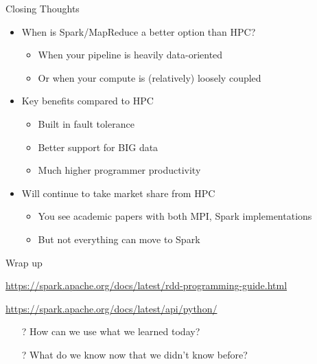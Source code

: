 \documentclass[aspectratio=169]{beamer}
\begin{document}
\begin{frame}{Closing Thoughts}

\begin{itemize}
\item When is Spark/MapReduce a better option than HPC?
	\begin{itemize}
	\item When your pipeline is heavily data-oriented
	\item Or when your compute is (relatively) loosely coupled
	\end{itemize}
\item Key benefits compared to HPC
	\begin{itemize}
	\item Built in fault tolerance
	\item Better support for BIG data 
	\item Much higher programmer productivity
	\end{itemize}
\item Will continue to take market share from HPC
	\begin{itemize}
	\item You see academic papers with both MPI, Spark implementations
	\item But not everything can move to Spark
	\end{itemize}
\end{itemize}
\end{frame}

\begin{frame}{Wrap up}
	
	\url{https://spark.apache.org/docs/latest/rdd-programming-guide.html}
	\vspace{2em}
	
	\url{https://spark.apache.org/docs/latest/api/python/}

\begin{itemize}
	\item[?] How can we use what we learned today?
	\vspace{2em}
	\item[?] What do we know now that we didn't know before?
\end{itemize}


\end{frame}
\end{document}
